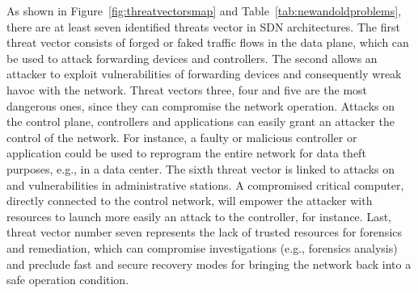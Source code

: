 %


As shown in Figure~\ref{fig:threatvectorsmap} and Table~\ref{tab:newandoldproblems}, there are at least seven 
identified threats vector in SDN architectures. The first threat vector consists of forged or faked traffic flows 
in the data plane, which can be used to attack forwarding devices and controllers. The second allows 
an attacker to exploit vulnerabilities of forwarding devices and consequently wreak havoc with the network. Threat 
vectors three, four and five are the most dangerous ones, since they can compromise the network operation. Attacks 
on the control plane, controllers and applications can easily grant an attacker the control of the network. For 
instance, a faulty or malicious controller or application could be used to reprogram the entire network for data 
theft purposes, e.g., in a data center. The sixth threat vector is linked to attacks on and vulnerabilities in 
administrative stations. A compromised critical computer, directly connected to the control network, will empower 
the attacker with resources to launch more easily an attack to the controller, for instance. Last, threat vector 
number seven represents the lack of trusted resources for forensics and remediation, which can compromise 
investigations (e.g., forensics analysis) and preclude fast and secure recovery modes for bringing the network 
back into a safe operation condition.

